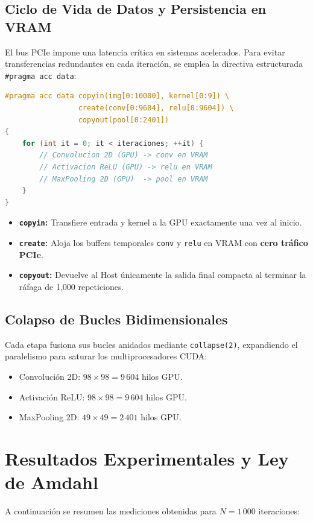 \documentclass[11pt,letterpaper]{article}
\begin{document}
\subsection{Ciclo de Vida de Datos y Persistencia en VRAM}
El bus PCIe impone una latencia crítica en sistemas acelerados. Para evitar transferencias redundantes en cada iteración, se emplea la directiva estructurada \texttt{\#pragma acc data}:
\begin{lstlisting}[language=C++]
#pragma acc data copyin(img[0:10000], kernel[0:9]) \
                 create(conv[0:9604], relu[0:9604]) \
                 copyout(pool[0:2401])
{
    for (int it = 0; it < iteraciones; ++it) {
        // Convolucion 2D (GPU) -> conv en VRAM
        // Activacion ReLU (GPU) -> relu en VRAM
        // MaxPooling 2D (GPU)  -> pool en VRAM
    }
}
\end{lstlisting}
\begin{itemize}
    \item \textbf{\texttt{copyin}:} Transfiere entrada y kernel a la GPU exactamente una vez al inicio.
    \item \textbf{\texttt{create}:} Aloja los buffers temporales \texttt{conv} y \texttt{relu} en VRAM con \textbf{cero tráfico PCIe}.
    \item \textbf{\texttt{copyout}:} Devuelve al Host únicamente la salida final compacta al terminar la ráfaga de 1,000 repeticiones.
\end{itemize}

\subsection{Colapso de Bucles Bidimensionales}
Cada etapa fusiona sus bucles anidados mediante \texttt{collapse(2)}, expandiendo el paralelismo para saturar los multiprocesadores CUDA:
\begin{itemize}
    \item Convolución 2D: $98 \times 98 = 9\,604$ hilos GPU.
    \item Activación ReLU: $98 \times 98 = 9\,604$ hilos GPU.
    \item MaxPooling 2D: $49 \times 49 = 2\,401$ hilos GPU.
\end{itemize}

\section{Resultados Experimentales y Ley de Amdahl}
A continuación se resumen las mediciones obtenidas para $N = 1\,000$ iteraciones:
\end{document}

